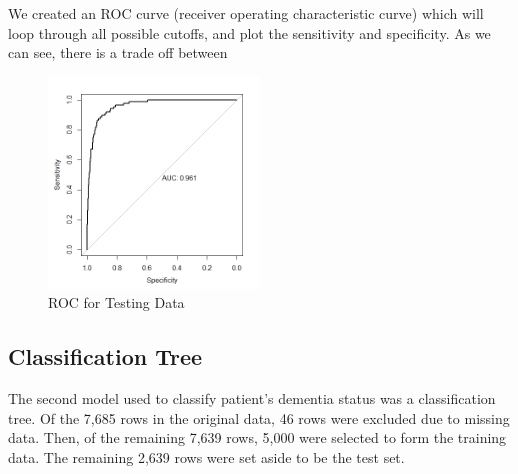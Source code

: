 \documentclass[a4paper,man,natbib,11pt]{article}
\begin{document}
We created an ROC curve (receiver operating characteristic curve) which will loop through all possible cutoffs, and plot the sensitivity and specificity. As we can see, there is a trade off between 
\begin{figure}[h!]
\centering
  \includegraphics[width=0.5\textwidth]{roc_logistic.png}
  \caption{ROC for Testing Data}
\end{figure}

\subsection{Classification Tree}

The second model used to classify patient's dementia status was a classification tree. Of the 7,685 rows in the original data, 46 rows were excluded due to missing data. Then, of the remaining 7,639 rows, 5,000 were selected to form the training data. The remaining 2,639 rows were set aside to be the test set.
\end{document}
